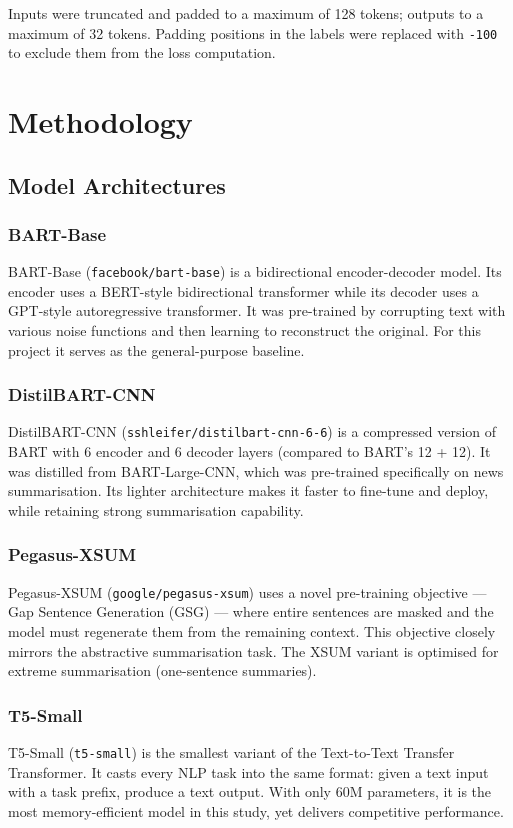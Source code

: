 \documentclass[12pt, a4paper]{report}
\begin{document}
Inputs were truncated and padded to a maximum of 128 tokens; outputs to a maximum of 32 tokens. Padding positions in the labels were replaced with \texttt{-100} to exclude them from the loss computation.

\chapter{Methodology}

\section{Model Architectures}

\subsection{BART-Base}
BART-Base (\texttt{facebook/bart-base}) is a bidirectional encoder-decoder model. Its encoder uses a BERT-style bidirectional transformer while its decoder uses a GPT-style autoregressive transformer. It was pre-trained by corrupting text with various noise functions and then learning to reconstruct the original. For this project it serves as the general-purpose baseline.

\subsection{DistilBART-CNN}
DistilBART-CNN (\texttt{sshleifer/distilbart-cnn-6-6}) is a compressed version of BART with 6 encoder and 6 decoder layers (compared to BART's 12 + 12). It was distilled from BART-Large-CNN, which was pre-trained specifically on news summarisation. Its lighter architecture makes it faster to fine-tune and deploy, while retaining strong summarisation capability.

\subsection{Pegasus-XSUM}
Pegasus-XSUM (\texttt{google/pegasus-xsum}) uses a novel pre-training objective --- Gap Sentence Generation (GSG) --- where entire sentences are masked and the model must regenerate them from the remaining context. This objective closely mirrors the abstractive summarisation task. The XSUM variant is optimised for extreme summarisation (one-sentence summaries).

\subsection{T5-Small}
T5-Small (\texttt{t5-small}) is the smallest variant of the Text-to-Text Transfer Transformer. It casts every NLP task into the same format: given a text input with a task prefix, produce a text output. With only 60M parameters, it is the most memory-efficient model in this study, yet delivers competitive performance.
\end{document}
